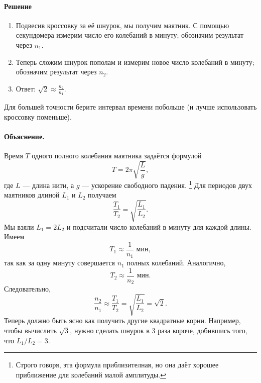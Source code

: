 \paragraph{Решение}

\begin{enumerate}
\item Подвесив кроссовку за её шнурок, мы получим маятник.
С помощью секундомера измерим число его колебаний в минуту;
обозначим результат через $n_1$.

\item Теперь сложим шнурок пополам и измерим новое число колебаний в минуту; обозначим результат через $n_{2}$.

\item Ответ: $\sqrt{2} \approx \frac{n_{2}}{n_{1}}$.
\end{enumerate}
Для большей точности берите интервал времени побольше
(и лучше использовать кроссовку поменьше).

\paragraph{Объяснение.}
Время $T$ одного полного колебания маятника задаётся формулой
\[
T = 2\pi \sqrt{\frac{L}{g}},
\]
где $L$ — длина нити, а $g$ — ускорение свободного падения.%
\footnote{Строго говоря, эта формула приблизителная, но она даёт хорошее приближение для колебаний малой амплитуды.}
Для периодов двух маятников длиной $L_{1}$ и $L_{2}$ получаем
\[
\frac{T_{1}}{T_{2}} = \sqrt{\frac{L_{1}}{L_{2}}}.
\]
Мы взяли $L_{1} = 2L_{2}$ и подсчитали число колебаний в минуту для каждой длины. Имеем
\[
T_{1} \approx \frac{1}{n_{1}}  \text{ мин},
\]
так как за одну минуту совершается $n_{1}$ полных колебаний. Аналогично,
\[
T_{2} \approx \frac{1}{n_{2}}  \text{ мин}.
\]
Следовательно,
\[
\frac{n_{2}}{n_{1}}
\approx
\frac{T_{1}}{T_{2}}
=
\sqrt{\frac{L_{1}}{L_{2}}}
=\sqrt{2}.
\]
Теперь должно быть ясно как получить другие квадратные корни.
Например, чтобы вычислить $\sqrt{3}$, нужно сделать шнурок в 3 раза короче, добившись того, что $L_{1}/L_{2} = 3$.
